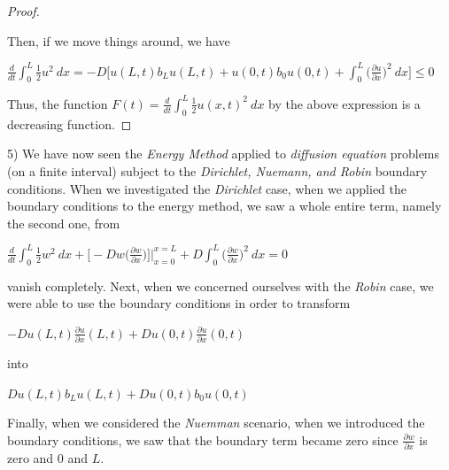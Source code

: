 \documentclass[12pt, executivepaper]{article}
\begin{document}
\begin{flushleft}
\begin{proof}
\begin{center}
\end{center}

Then, if we move things around, we have

\begin{center}

$\frac{d}{dt}\int_{0}^{L} \frac{1}{2} u^2 \ dx=-D\bigg[u(L,t) b_{L} u(L,t) + u(0,t) b_{0}u(0,t) + \int_{0}^{L} \bigg(\frac{\partial u}{\partial x}\bigg)^2 \ dx\bigg] \leq 0$

\end{center}

\pagebreak

\vspace*{-40mm}

Thus, the function $F(t)=\frac{d}{dt} \int_{0}^{L} \frac{1}{2} u(x,t)^2 \ dx$ by the above expression is a decreasing function.

\end{proof}

\end{flushleft}

\begin{flushleft}

5) We have now seen the \textit{Energy Method} applied to \textit{diffusion equation} problems (on a finite interval) subject to the \textit{Dirichlet, Nuemann, and Robin} boundary conditions. When we investigated the \textit{Dirichlet} case, when we applied the boundary conditions to the energy method, we saw a whole entire term, namely the second one, from 

\begin{center}

$\frac{d}{dt}\int_{0}^{L} \frac{1}{2} w^2 \ dx + \bigg[-Dw \bigg(\frac{\partial w}{\partial x}\bigg)\bigg] \Big|_{x=0}^{x=L}+ D \int_{0}^{L} \bigg(\frac{\partial w}{\partial x}\bigg)^2 \ dx=0$

\end{center}

vanish completely. Next, when we concerned ourselves with the \textit{Robin} case, we were able to use the boundary conditions in order to transform

\begin{center}

$-Du(L,t) \frac{\partial u}{\partial x}(L,t) + Du(0,t) \frac{\partial u}{\partial x}(0,t)$

\end{center}

into

\begin{center}

$Du(L,t) b_{L} u(L,t) + Du(0,t) b_{0}u(0,t)$

\end{center}

Finally, when we considered the \textit{Nuemman} scenario, when we introduced the boundary conditions, we saw that the boundary term became zero since $\frac{\partial w}{\partial x}$ is zero and $0$ and $L$.

\end{flushleft}
\end{document}
